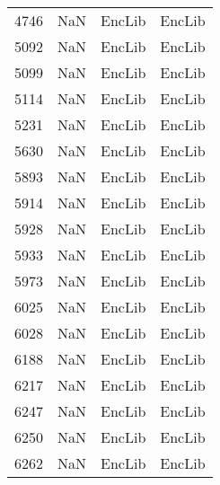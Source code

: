 \begin{tabular}{llll}
4746 &                   NaN &                     EncLib &                                    EncLib \\
5092 &                   NaN &                     EncLib &                                    EncLib \\
5099 &                   NaN &                     EncLib &                                    EncLib \\
5114 &                   NaN &                     EncLib &                                    EncLib \\
5231 &                   NaN &                     EncLib &                                    EncLib \\
5630 &                   NaN &                     EncLib &                                    EncLib \\
5893 &                   NaN &                     EncLib &                                    EncLib \\
5914 &                   NaN &                     EncLib &                                    EncLib \\
5928 &                   NaN &                     EncLib &                                    EncLib \\
5933 &                   NaN &                     EncLib &                                    EncLib \\
5973 &                   NaN &                     EncLib &                                    EncLib \\
6025 &                   NaN &                     EncLib &                                    EncLib \\
6028 &                   NaN &                     EncLib &                                    EncLib \\
6188 &                   NaN &                     EncLib &                                    EncLib \\
6217 &                   NaN &                     EncLib &                                    EncLib \\
6247 &                   NaN &                     EncLib &                                    EncLib \\
6250 &                   NaN &                     EncLib &                                    EncLib \\
6262 &                   NaN &                     EncLib &                                    EncLib \\

\end{tabular}
